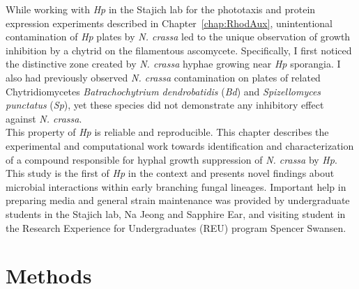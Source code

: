\indent While working with \textit{Hp} in the Stajich lab for the phototaxis and protein expression experiments described in Chapter~\ref{chap:RhodAux}, unintentional contamination of \textit{Hp} plates by \textit{N. crassa} led to the unique observation of growth inhibition by a chytrid on the filamentous ascomycete. Specifically, I first noticed the distinctive zone created by \textit{N. crassa} hyphae growing near \textit{Hp} sporangia. I also had previously observed \textit{N. crassa} contamination on plates of related Chytridiomycetes \textit{Batrachochytrium dendrobatidis} (\textit{Bd}) and \textit{Spizellomyces punctatus} (\textit{Sp}), yet these species did not demonstrate any inhibitory effect against \textit{N. crassa}.\\
\indent This property of \textit{Hp} is reliable and reproducible. This chapter describes the experimental and computational work towards identification and characterization of a compound responsible for hyphal growth suppression of \textit{N. crassa} by \textit{Hp}. This study is the first of \textit{Hp} in the context and presents novel findings about microbial interactions within early branching fungal lineages. Important help in preparing media and general strain maintenance was provided by undergraduate students in the Stajich lab, Na Jeong and Sapphire Ear, and visiting student in the Research Experience for Undergraduates (REU) program Spencer Swansen.\\
\section{Methods}
